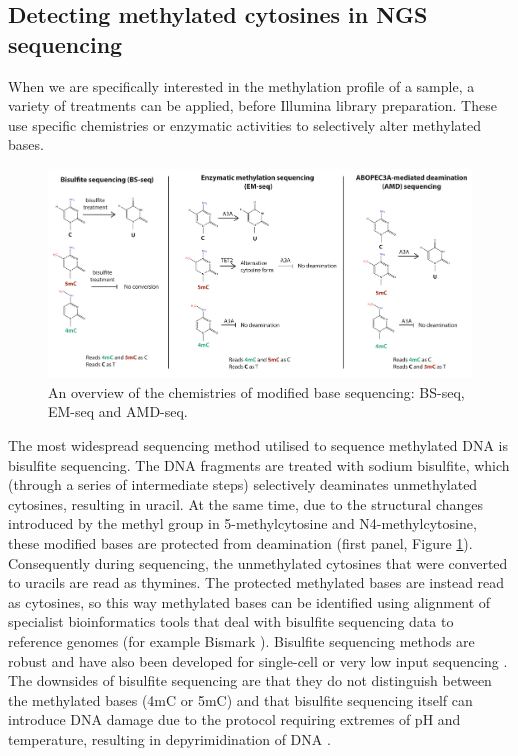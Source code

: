 \subsection{Detecting methylated cytosines in NGS sequencing}

When we are specifically interested in the methylation profile of a sample, a variety of treatments can be applied, before Illumina library preparation. These use specific chemistries or enzymatic activities to selectively alter methylated bases.

\begin{figure}[htbp!] 
\centering    
    \includegraphics[width=1\textwidth]{Chapter1/Figs/sequencing_chemistries.pdf}
\caption{An overview of the chemistries of modified base sequencing: BS-seq, EM-seq and AMD-seq.}
\label{fig:sequencing_chemistries}
\captionsetup{font=small}
\end{figure}

The most widespread sequencing method utilised to sequence methylated DNA is bisulfite sequencing. The DNA fragments are treated with sodium bisulfite, which (through a series of intermediate steps) selectively deaminates unmethylated cytosines, resulting in uracil. At the same time, due to the structural changes introduced by the methyl group in 5-methylcytosine and N4-methylcytosine, these modified bases are protected from deamination (first panel, Figure \ref{fig:sequencing_chemistries}). Consequently during sequencing, the unmethylated cytosines that were converted to uracils are read as thymines. The protected methylated bases are instead read as cytosines, so this way methylated bases can be identified using alignment of specialist bioinformatics tools that deal with bisulfite sequencing data to reference genomes (for example Bismark \cite{RN229}). Bisulfite sequencing methods are robust and have also been developed for single-cell or very low input sequencing \cite{RN207}. The downsides of bisulfite sequencing are that they do not distinguish between the methylated bases (4mC or 5mC) \cite{RN200} and that bisulfite sequencing itself can introduce DNA damage due to the protocol requiring extremes of pH and temperature, resulting in depyrimidination of DNA \cite{RN318}.

